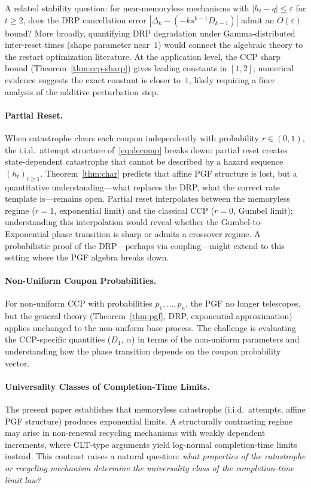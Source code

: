 \documentclass[11pt]{article}
\theoremstyle{plain}
\theoremstyle{definition}
\theoremstyle{remark}
\begin{document}
A related stability question: for near-memoryless mechanisms with $|h_t - q| \leq \varepsilon$ for $t \geq 2$, does the DRP cancellation error $|\Delta_k - (-ks^{k-1}D_{k-1})|$ admit an $O(\varepsilon)$ bound?  More broadly, quantifying DRP degradation under Gamma-distributed inter-reset times (shape parameter near~$1$) would connect the algebraic theory to the restart optimization literature.  At the application level, the CCP sharp bound (Theorem~\ref{thm:ccp-sharp}) gives leading constants in $[1,2]$; numerical evidence suggests the exact constant is closer to~$1$, likely requiring a finer analysis of the additive perturbation step.

\paragraph{Partial Reset.}
When catastrophe clears each coupon independently with probability $r \in (0,1)$, the i.i.d.\ attempt structure of~\eqref{eq:decomp} breaks down: partial reset creates state-dependent catastrophe that cannot be described by a hazard sequence $(h_t)_{t \geq 1}$.  Theorem~\ref{thm:char} predicts that affine PGF structure is lost, but a quantitative understanding---what replaces the DRP, what the correct rate template is---remains open.  Partial reset interpolates between the memoryless regime ($r = 1$, exponential limit) and the classical CCP ($r = 0$, Gumbel limit); understanding this interpolation would reveal whether the Gumbel-to-Exponential phase transition is sharp or admits a crossover regime.  A probabilistic proof of the DRP---perhaps via coupling---might extend to this setting where the PGF algebra breaks down.

\paragraph{Non-Uniform Coupon Probabilities.}
For non-uniform CCP with probabilities $p_1, \ldots, p_n$, the PGF no longer telescopes, but the general theory (Theorem~\ref{thm:pgf}, DRP, exponential approximation) applies unchanged to the non-uniform base process.  The challenge is evaluating the CCP-specific quantities ($D_1$, $\alpha$) in terms of the non-uniform parameters and understanding how the phase transition depends on the coupon probability vector.

\paragraph{Universality Classes of Completion-Time Limits.}
The present paper establishes that memoryless catastrophe (i.i.d.\ attempts, affine PGF structure) produces exponential limits.  A structurally contrasting regime may arise in non-renewal recycling mechanisms with weakly dependent increments, where CLT-type arguments yield log-normal completion-time limits instead.  This contrast raises a natural question: \emph{what properties of the catastrophe or recycling mechanism determine the universality class of the completion-time limit law?}

\newpage


\end{document}
